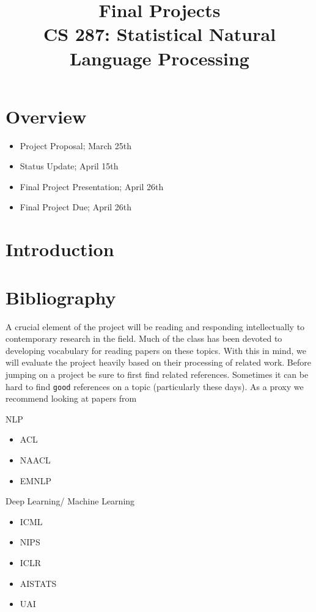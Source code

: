\documentclass[11pt]{article}
\title{Final Projects  \\ CS 287: Statistical Natural Language Processing}
\date{}
\begin{document}
\maketitle{}
\section{Overview}

\begin{itemize}
\item Project Proposal; March 25th
\item Status Update; April 15th
\item Final Project Presentation; April 26th
\item Final Project Due; April 26th
\end{itemize}

\vspace{-1.75cm}
\section{Introduction}


\section{Bibliography}

A crucial element of the project will be reading and responding
intellectually to contemporary research in the field. Much of the
class has been devoted to developing vocabulary for reading papers on
these topics.  With this in mind, we will evaluate the project heavily
based on their processing of related work. Before jumping on a project
be sure to first find related references. Sometimes it can be hard to 
find \texttt{good} references on a topic (particularly these days). As 
a proxy  we recommend looking at papers from

NLP
\begin{itemize}
\item ACL
\item NAACL
\item EMNLP
\end{itemize}

Deep Learning/ Machine Learning
\begin{itemize}
\item ICML
\item NIPS
\item ICLR
\item AISTATS
\item UAI
\end{itemize}
\end{document}

